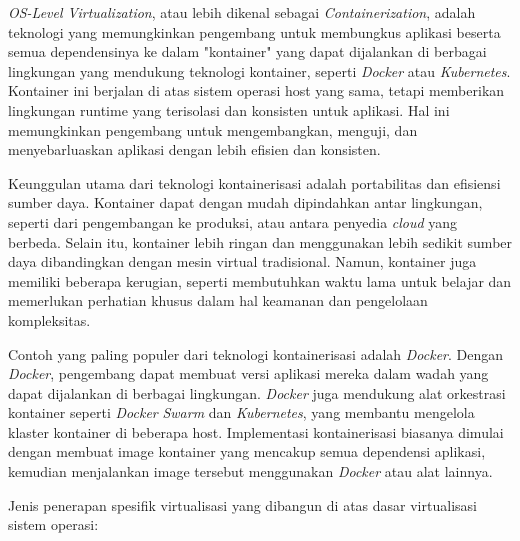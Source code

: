 \documentclass[12pt]{article}
\begin{document}
\begin{enumerate}
    \par \textit{OS-Level Virtualization}, atau lebih dikenal sebagai \textit{Containerization}, adalah teknologi yang memungkinkan pengembang untuk membungkus aplikasi beserta semua dependensinya ke dalam "kontainer" yang dapat dijalankan di berbagai lingkungan yang mendukung teknologi kontainer, seperti \textit{Docker} atau \textit{Kubernetes}. Kontainer ini berjalan di atas sistem operasi host yang sama, tetapi memberikan lingkungan runtime yang terisolasi dan konsisten untuk aplikasi. Hal ini memungkinkan pengembang untuk mengembangkan, menguji, dan menyebarluaskan aplikasi dengan lebih efisien dan konsisten.

    \par Keunggulan utama dari teknologi kontainerisasi adalah portabilitas dan efisiensi sumber daya. Kontainer dapat dengan mudah dipindahkan antar lingkungan, seperti dari pengembangan ke produksi, atau antara penyedia \textit{cloud} yang berbeda. Selain itu, kontainer lebih ringan dan menggunakan lebih sedikit sumber daya dibandingkan dengan mesin virtual tradisional. Namun, kontainer juga memiliki beberapa kerugian, seperti membutuhkan waktu lama untuk belajar dan memerlukan perhatian khusus dalam hal keamanan dan pengelolaan kompleksitas.
    
    \par Contoh yang paling populer dari teknologi kontainerisasi adalah \textit{Docker}. Dengan \textit{Docker}, pengembang dapat membuat versi aplikasi mereka dalam wadah yang dapat dijalankan di berbagai lingkungan. \textit{Docker} juga mendukung alat orkestrasi kontainer seperti \textit{Docker} \textit{Swarm} dan \textit{Kubernetes}, yang membantu mengelola klaster kontainer di beberapa host. Implementasi kontainerisasi biasanya dimulai dengan membuat image kontainer yang mencakup semua dependensi aplikasi, kemudian menjalankan image tersebut menggunakan \textit{Docker} atau alat lainnya.
\end{enumerate}

\par Jenis penerapan spesifik virtualisasi yang dibangun di atas dasar virtualisasi sistem operasi:
\end{document}

